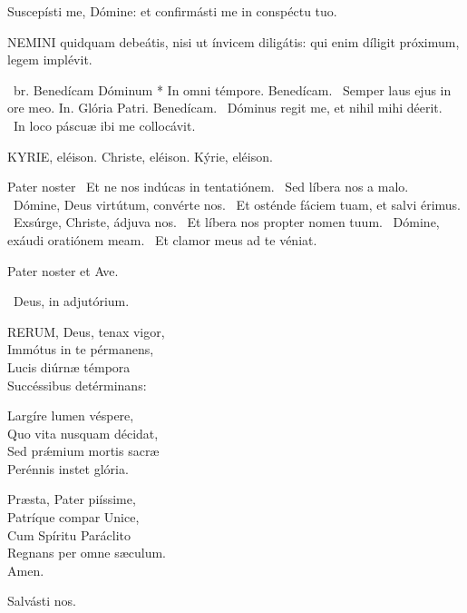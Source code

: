  Suscepísti me, Dómine: et confirmásti me in conspéctu tuo.



\lettrine[lines=2]{N}{EMINI} quidquam debeátis, nisi ut ínvicem diligátis: qui enim díligit próximum, legem implévit.

\R\ br. Benedícam Dóminum * In omni témpore. Benedícam. \V\ Semper laus ejus in ore meo. In. Glória Patri. Benedícam. \V\ Dóminus regit me, et nihil mihi déerit. \R\ In loco páscuæ ibi me collocávit.



KYRIE, eléison. Christe, eléison. Kýrie, eléison.

Pater noster  \V\ Et ne nos indúcas in tentatiónem. \R\ Sed líbera nos a malo. \V\ Dómine, Deus virtútum, convérte nos. \R\ Et osténde fáciem tuam, et salvi érimus. \V\ Exsúrge, Christe, ádjuva nos. \R\ Et líbera nos propter nomen tuum. \V\ Dómine, exáudi oratiónem meam. \R\ Et clamor meus ad te véniat.



Pater noster et Ave.

\V\ Deus, in adjutórium.


\lettrine[lines=2]{R}{ERUM}, Deus, tenax vigor,\\
Immótus in te pérmanens,\\
Lucis diúrnæ témpora\\
Succéssibus detérminans:

Largíre lumen véspere,\\
Quo vita nusquam décidat,\\
Sed prǽmium mortis sacræ\\
Perénnis instet glória.

Præsta, Pater piíssime,\\
Patríque compar Unice,\\
Cum Spíritu Paráclito\\
Regnans per omne sæculum.\\
Amen.

 Salvásti nos.


